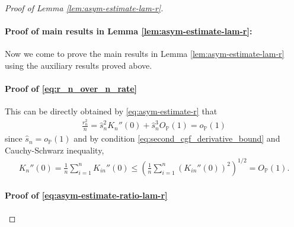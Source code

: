 \documentclass[12pt]{article}
\theoremstyle{definition}
\def\P{\mathbb{P}}
\def\P{\mathbb{P}}
\renewcommand{\P}{\mathbb{P}}							%
\begin{document}
\begin{proof}[Proof of Lemma \ref{lem:asym-estimate-lam-r}]
	\paragraph{Proof of main results in Lemma \ref{lem:asym-estimate-lam-r}:}

	Now we come to prove the main results in Lemma \ref{lem:asym-estimate-lam-r} using the auxiliary results proved above.

	\paragraph{Proof of \eqref{eq:r_n_over_n_rate}}

	This can be directly obtained by \eqref{eq:asym-estimate-r} that
	\begin{align*}
		\frac{r_n^2}{n}=\hat s_n^2K_n''(0)+\hat s_n^3O_{\P}(1)=o_{\P}(1)
	\end{align*}
	since $\hat s_n=o_{\P}(1)$ and by condition \eqref{eq:second_cgf_derivative_bound} and Cauchy-Schwarz inequality,
	\begin{align*}
		K_n''(0)=\frac{1}{n}\sum_{i=1}^n K_{in}''(0)\leq \left(\frac{1}{n}\sum_{i=1}^n (K_{in}''(0))^2\right)^{1/2}=O_{\P}(1).
	\end{align*}
	
	\paragraph{Proof of \eqref{eq:asym-estimate-ratio-lam-r}}


\end{proof}
\end{document}
